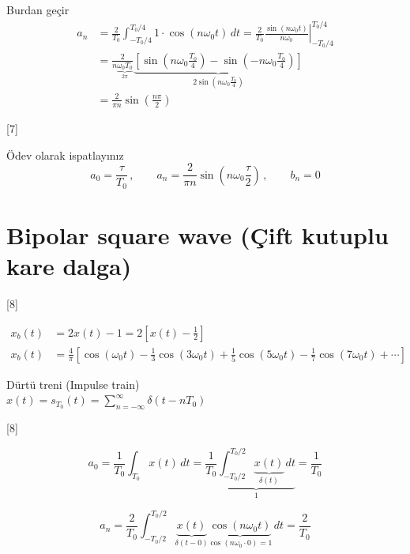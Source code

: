\documentclass[11pt,a4paper]{article}
\begin{document}
Burdan geçir
\begin{align*}
a_n &= \frac{2}{T_0}\int_{-T_0/4}^{T_0/4}1\cdot\cos(n\omega_0 t)\,dt=\frac{2}{T_0}\left.\frac{\sin(n\omega_0 t)}{n\omega_0}\right|_{-T_0/4}^{T_0/4} \\
&= \frac{2}{n\underbrace{\omega_0 T_0}_{2\pi}}\underbrace{\left[\sin\left(n\omega_0\frac{T_0}{4}\right)-\sin\left(-n\omega_0\frac{T_0}{4}\right)\right]}_{2\sin\left(n\omega_0\frac{T_0}{4}\right)} \\
&= \frac{2}{\pi n}\sin\left(\frac{n\pi}{2}\right)
\end{align*}

[7]

Ödev olarak ispatlayınız
\[ a_0=\frac{\tau}{T_0}\,,\qquad a_n=\frac{2}{\pi n}\sin\left(n\omega_0\frac{\tau}{2}\right)\,,\qquad b_n=0 \]

\section{Bipolar square wave (Çift kutuplu kare dalga)}

[8]

\begin{align*}
x_b(t) &= 2x(t)-1 = 2\left[x(t)-\frac{1}{2}\right] \\
x_b(t) &= \frac{4}{\pi}\left[\cos(\omega_0 t)-\frac{1}{3}\cos(3\omega_0 t)+\frac{1}{5}\cos(5\omega_0 t)-\frac{1}{7}\cos(7\omega_0 t)+\cdots\right]
\end{align*}

\begin{ornek}
Dürtü treni (Impulse train) \\
$x(t)=s_{T_0}(t)=\displaystyle\sum_{n=-\infty}^{\infty}\delta(t-nT_0)$
\end{ornek}

[8]

\[ a_0=\frac{1}{T_0}\int_{T_0}x(t)\,dt=\frac{1}{T_0}\underbrace{\int_{-T_0/2}^{T_0/2}\underbrace{x(t)}_{\delta(t)}\,dt}_{1}=\frac{1}{T_0} \]


\[ a_n=\frac{2}{T_0}\int_{-T_0/2}^{T_0/2}\underbrace{x(t)}_{\delta(t-0)}\underbrace{\cos(n\omega_0 t)}_{\cos(n\omega_0\cdot 0)=1}\,dt=\frac{2}{T_0} \]
\end{document}
